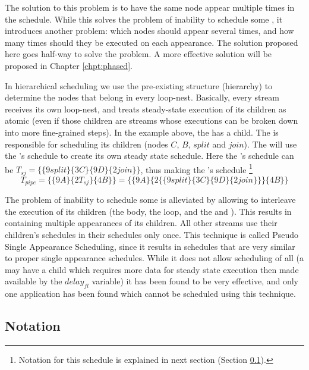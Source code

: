 The solution to this problem is to have the same node appear
multiple times in the schedule.  While this solves the problem of
inability to schedule some {\feedbackloops}, it introduces another
problem: which nodes should appear several times, and how many
times should they be executed on each appearance.  The solution
proposed here goes half-way to solve the problem. A more effective
solution will be proposed in Chapter \ref{chpt:phased}.

In hierarchical scheduling we use the pre-existing structure
(hierarchy) to determine the nodes that belong in every loop-nest.
Basically, every stream receives its own loop-nest, and treats
steady-state execution of its children as atomic (even if those
children are streams whose executions can be broken down into more
fine-grained steps). In the example above, the {\pipeline} has a
{\splitjoin} child.  The {\splitjoin} is responsible for
scheduling its children (nodes $C$, $B$, $split$ and $join$).  The
{\pipeline} will use the {\splitjoin}'s schedule to create its
own steady state schedule. Here the {\splitjoin}'s schedule can be
$T_{sj} = \{\{9 split\}\{3C\}\{9D\}\{2 join\}\}$, thus making the
{\pipeline}'s schedule \footnote{Notation for this schedule is
explained in next section (Section
\ref{sec:hierarchical-notation}).} $$T_{pipe} = \{\{9A\}\{2
T_{sj}\}\{4B\}\} = \{\{9A\}\{2\{\{9 split\}\{3C\}\{9D\}\{2
join\}\}\}\{4B\}\}$$


The problem of inability to schedule some {\feedbackloops} is
alleviated by allowing {\feedbackloop} to interleave the execution
of its children (the body, the loop, and the {\splitter} and
{\joiner}).  This results in {\feedbackloop} containing multiple
appearances of its children. All other streams use their
children's schedules in their schedules only once. This technique
is called Pseudo Single Appearance Scheduling, since it results in
schedules that are very similar to proper single appearance
schedules. While it does not allow scheduling of all
{\feedbackloops} (a {\feedbackloop} may have a child which
requires more data for steady state execution then made available
by the $delay_{fl}$ variable) it has been found to be very
effective, and only one application has been found which cannot be
scheduled using this technique.

\subsection{Notation}
\label{sec:hierarchical-notation}

